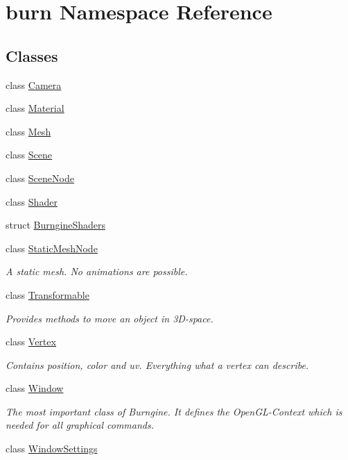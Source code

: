 \hypertarget{namespaceburn}{\section{burn Namespace Reference}
\label{namespaceburn}
}
\subsection*{Classes}
\begin{DoxyCompactItemize}
\item 
class \hyperlink{classburn_1_1_camera}{Camera}
\item 
class \hyperlink{classburn_1_1_material}{Material}
\item 
class \hyperlink{classburn_1_1_mesh}{Mesh}
\item 
class \hyperlink{classburn_1_1_scene}{Scene}
\item 
class \hyperlink{classburn_1_1_scene_node}{Scene\-Node}
\item 
class \hyperlink{classburn_1_1_shader}{Shader}
\item 
struct \hyperlink{structburn_1_1_burngine_shaders}{Burngine\-Shaders}
\item 
class \hyperlink{classburn_1_1_static_mesh_node}{Static\-Mesh\-Node}
\begin{DoxyCompactList}\small\item\em A static mesh. No animations are possible. \end{DoxyCompactList}\item 
class \hyperlink{classburn_1_1_transformable}{Transformable}
\begin{DoxyCompactList}\small\item\em Provides methods to move an object in 3\-D-\/space. \end{DoxyCompactList}\item 
class \hyperlink{classburn_1_1_vertex}{Vertex}
\begin{DoxyCompactList}\small\item\em Contains position, color and uv. Everything what a vertex can describe. \end{DoxyCompactList}\item 
class \hyperlink{classburn_1_1_window}{Window}
\begin{DoxyCompactList}\small\item\em The most important class of Burngine. It defines the Open\-G\-L-\/\-Context which is needed for all graphical commands. \end{DoxyCompactList}\item 
class \hyperlink{classburn_1_1_window_settings}{Window\-Settings}
\end{DoxyCompactItemize}
